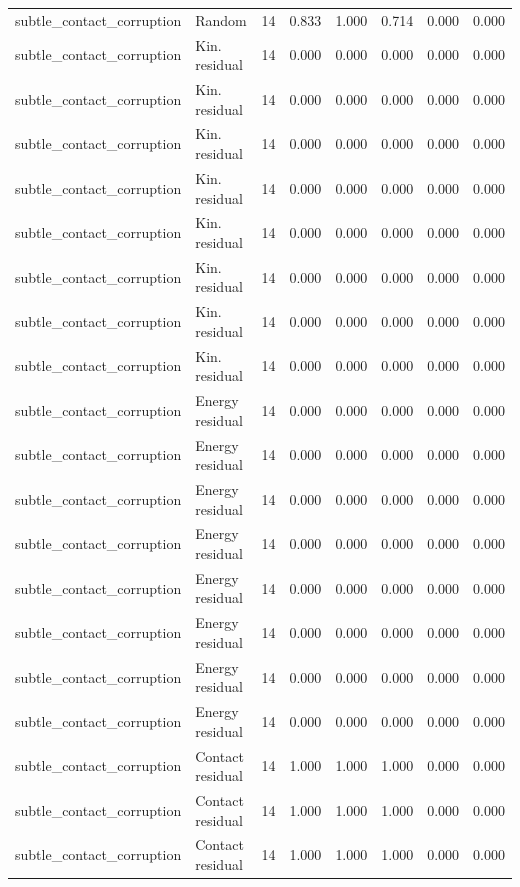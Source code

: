 {\begin{longtable}{llrrrrrr}
subtle\_contact\_corruption & Random & 14 & 0.833 & 1.000 & 0.714 & 0.000 & 0.000 \\
subtle\_contact\_corruption & Kin. residual & 14 & 0.000 & 0.000 & 0.000 & 0.000 & 0.000 \\
subtle\_contact\_corruption & Kin. residual & 14 & 0.000 & 0.000 & 0.000 & 0.000 & 0.000 \\
subtle\_contact\_corruption & Kin. residual & 14 & 0.000 & 0.000 & 0.000 & 0.000 & 0.000 \\
subtle\_contact\_corruption & Kin. residual & 14 & 0.000 & 0.000 & 0.000 & 0.000 & 0.000 \\
subtle\_contact\_corruption & Kin. residual & 14 & 0.000 & 0.000 & 0.000 & 0.000 & 0.000 \\
subtle\_contact\_corruption & Kin. residual & 14 & 0.000 & 0.000 & 0.000 & 0.000 & 0.000 \\
subtle\_contact\_corruption & Kin. residual & 14 & 0.000 & 0.000 & 0.000 & 0.000 & 0.000 \\
subtle\_contact\_corruption & Kin. residual & 14 & 0.000 & 0.000 & 0.000 & 0.000 & 0.000 \\
subtle\_contact\_corruption & Energy residual & 14 & 0.000 & 0.000 & 0.000 & 0.000 & 0.000 \\
subtle\_contact\_corruption & Energy residual & 14 & 0.000 & 0.000 & 0.000 & 0.000 & 0.000 \\
subtle\_contact\_corruption & Energy residual & 14 & 0.000 & 0.000 & 0.000 & 0.000 & 0.000 \\
subtle\_contact\_corruption & Energy residual & 14 & 0.000 & 0.000 & 0.000 & 0.000 & 0.000 \\
subtle\_contact\_corruption & Energy residual & 14 & 0.000 & 0.000 & 0.000 & 0.000 & 0.000 \\
subtle\_contact\_corruption & Energy residual & 14 & 0.000 & 0.000 & 0.000 & 0.000 & 0.000 \\
subtle\_contact\_corruption & Energy residual & 14 & 0.000 & 0.000 & 0.000 & 0.000 & 0.000 \\
subtle\_contact\_corruption & Energy residual & 14 & 0.000 & 0.000 & 0.000 & 0.000 & 0.000 \\
subtle\_contact\_corruption & Contact residual & 14 & 1.000 & 1.000 & 1.000 & 0.000 & 0.000 \\
subtle\_contact\_corruption & Contact residual & 14 & 1.000 & 1.000 & 1.000 & 0.000 & 0.000 \\
subtle\_contact\_corruption & Contact residual & 14 & 1.000 & 1.000 & 1.000 & 0.000 & 0.000 \\

\end{longtable}}
